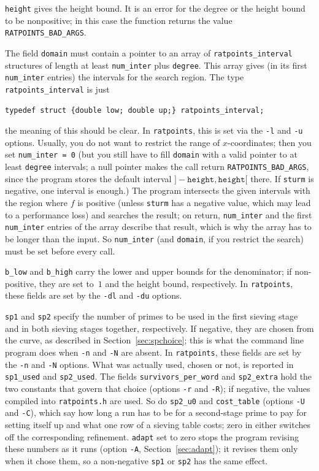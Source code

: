 \documentclass[12pt,a4paper,oneside]{amsart}
\begin{document}
\texttt{height} gives the height bound. It is an error for the
degree or the height bound to be nonpositive; in this case the function
returns the value \texttt{RATPOINTS\_BAD\_ARGS}.

The field \texttt{domain} must contain a pointer to an array of
\texttt{ratpoints\_interval} structures of length at least \texttt{num\_inter}
plus \texttt{degree}. This array gives (in its first \texttt{num\_inter} entries)
the intervals for the search region. The type \texttt{ratpoints\_interval}
is just

\begin{verbatim}
typedef struct {double low; double up;} ratpoints_interval;
\end{verbatim}

the meaning of this should be clear. In \texttt{ratpoints}, this is set
via the \verb+-l+ and \verb+-u+ options. Usually, you do not want to
restrict the range of $x$-coordinates; then you set \texttt{num\_inter = 0}
(but you still have to fill \texttt{domain} with a valid pointer to at least
\texttt{degree} intervals; a null pointer makes the call return
\texttt{RATPOINTS\_BAD\_ARGS}, since the program stores the default
interval $]-\texttt{height}, \texttt{height}[$ there. If \texttt{sturm} is
negative, one interval is enough.)
The program intersects the given intervals with the region where $f$ is
positive (unless \texttt{sturm} has a negative value, which may lead to a
performance loss) and searches the result; on return, \texttt{num\_inter}
and the first \texttt{num\_inter} entries of the array describe that
result, which is why the array has to be longer than the input. So
\texttt{num\_inter} (and \texttt{domain}, if you restrict the search) must
be set before every call.

\texttt{b\_low} and \texttt{b\_high}
carry the lower and upper bounds for the denominator; if non-positive, they are
set to~$1$ and the height bound, respectively. In \texttt{ratpoints}, these
fields are set by the \verb+-dl+ and \verb+-du+ options.

\texttt{sp1} and \texttt{sp2}
specify the number of primes to be used in the first sieving stage and
in both sieving stages together, respectively. If negative, they are chosen
from the curve, as described in Section~\ref{sec:spchoice}; this is what the
command line program does when \verb+-n+ and \verb+-N+ are absent. In
\texttt{ratpoints}, these fields are set by the
\verb+-n+ and \verb+-N+ options. What was actually used, chosen or not,
is reported in \texttt{sp1\_used} and \texttt{sp2\_used}. The fields
\texttt{survivors\_per\_word} and \texttt{sp2\_extra} hold the two
constants that govern that choice (options \verb+-r+ and \verb+-R+); if
negative, the values compiled into \texttt{ratpoints.h} are used. So do
\texttt{sp2\_u0} and \texttt{cost\_table} (options \verb+-U+ and \verb+-C+),
which say how long a run has to be for a second-stage prime to pay for
setting itself up and what one row of a sieving table costs; zero in either
switches off the corresponding refinement. \texttt{adapt} set to zero stops
the program revising these numbers as it runs (option \verb+-A+,
Section~\ref{sec:adapt}); it revises them only when it chose them, so a
non-negative \texttt{sp1} or \texttt{sp2} has the same effect.
\end{document}
